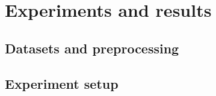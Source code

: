 \documentclass[11pt]{article}
\begin{document}
\section{Experiments and results}\label{sec:experiments-results}

\subsection{Datasets and preprocessing}\label{sec:datas-prepr}






\subsection{Experiment setup}\label{sec:experiment-setup}



\end{document}

